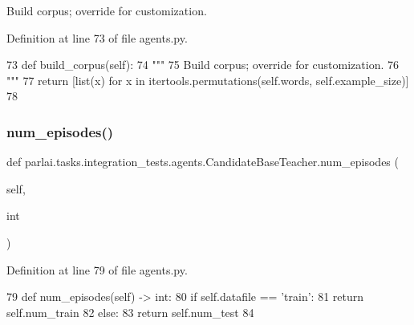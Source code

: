 \begin{DoxyVerb}Build corpus; override for customization.
\end{DoxyVerb}
 

Definition at line 73 of file agents.\+py.


\begin{DoxyCode}
73     \textcolor{keyword}{def }build\_corpus(self):
74         \textcolor{stringliteral}{"""}
75 \textcolor{stringliteral}{        Build corpus; override for customization.}
76 \textcolor{stringliteral}{        """}
77         \textcolor{keywordflow}{return} [list(x) \textcolor{keywordflow}{for} x \textcolor{keywordflow}{in} itertools.permutations(self.words, self.example\_size)]
78 
\end{DoxyCode}
\mbox{\label{classparlai_1_1tasks_1_1integration__tests_1_1agents_1_1CandidateBaseTeacher_aea8447f8dee0c3e60e0f4a444a01e239}} 
\subsubsection{\texorpdfstring{num\+\_\+episodes()}{num\_episodes()}}
{\footnotesize\ttfamily def parlai.\+tasks.\+integration\+\_\+tests.\+agents.\+Candidate\+Base\+Teacher.\+num\+\_\+episodes (\begin{DoxyParamCaption}\item[{}]{self,  }\item[{}]{int }\end{DoxyParamCaption})}



Definition at line 79 of file agents.\+py.


\begin{DoxyCode}
79     \textcolor{keyword}{def }num\_episodes(self) -> int:
80         \textcolor{keywordflow}{if} self.datafile == \textcolor{stringliteral}{'train'}:
81             \textcolor{keywordflow}{return} self.num\_train
82         \textcolor{keywordflow}{else}:
83             \textcolor{keywordflow}{return} self.num\_test
84 
\end{DoxyCode}
\mbox{\label{classparlai_1_1tasks_1_1integration__tests_1_1agents_1_1CandidateBaseTeacher_afff9316bcd22ef04a25e4325cedd2ba8}} 

